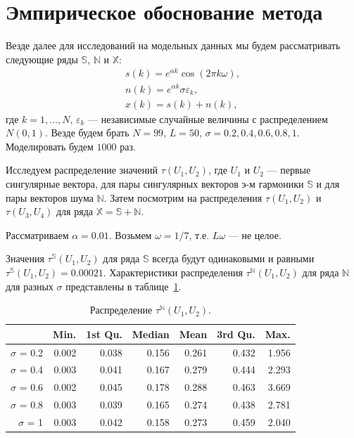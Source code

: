 \documentclass[specialist,
               substylefile = spbu.rtx,
               subf,href,colorlinks=true, 12pt]{disser}
\begin{document}
\section{Эмпирическое обоснование метода}
\label{sec:tau_study}
Везде далее для исследований на модельных данных мы будем рассматривать следующие ряды $\mathbb{S}$, $\mathbb{N}$ и $\mathbb{X}$:
\begin{gather} \label{eq:series_S_N}
s(k) =  e^{\alpha k} \cos(2\pi k \omega), \\  \label{eq:series_N_N}
n(k) =  e^{\alpha k} \sigma \varepsilon_k, \\ \label{eq:series_X_N}
x(k) = s(k) + n(k),
\end{gather}
где $k=1,\ldots,N$, $\varepsilon_k$ --- независимые случайные величины с распределением $N(0,1)$. Везде будем брать $N = 99$, $L = 50$, $\sigma = 0.2, 0.4, 0.6, 0.8, 1$. Моделировать будем $1000$ раз.

Исследуем распределение
 значений $\tau(U_1, U_2)$, где $U_1$ и $U_2$ --- первые сингулярные вектора, для пары сингулярных векторов э-м гармоники $\mathbb{S}$ и для пары векторов шума $\mathbb{N}$. Затем посмотрим на распределения  $\tau(U_1, U_2)$ и  $\tau(U_3, U_4)$ для ряда $\mathbb{X} = \mathbb{S} + \mathbb{N}$.

Рассматриваем $\alpha = 0.01$. Возьмем $\omega = 1/7$, т.е. $L\omega$ --- не целое.

Значения $\tau^{\mathbb{S}}(U_1, U_2)$  для ряда $\mathbb{S}$ всегда будут одинаковыми и равными  $\tau^{\mathbb{S}}(U_1, U_2) = 0.00021$. Характеристики распределения $\tau^{\mathbb{N}}(U_1, U_2)$ для ряда $\mathbb{N}$ для разных $\sigma$ представлены в таблице~\ref{tab:model_dist_tau1_sig_notint}.

\begin{table}[hhh!]
\caption{Распределение $\tau^{\mathbb{N}}(U_1, U_2)$.}
\centering
\begin{tabular}{rrrrrrr}
  \hline
 & Min. & 1st Qu. & Median & Mean & 3rd Qu. & Max. \\
  \hline
$\sigma$ = 0.2 & 0.002 & 0.038 & 0.156 & 0.261 & 0.432 & 1.956 \\ 
  $\sigma$ = 0.4 & 0.003 & 0.041 & 0.167 & 0.279 & 0.444 & 2.293 \\ 
  $\sigma$ = 0.6 & 0.002 & 0.045 & 0.178 & 0.288 & 0.463 & 3.669 \\ 
  $\sigma$ = 0.8 & 0.003 & 0.039 & 0.165 & 0.274 & 0.438 & 2.781 \\ 
  $\sigma$ = 1 & 0.003 & 0.042 & 0.158 & 0.273 & 0.459 & 2.040 \\ 
   \hline
\end{tabular}
\label{tab:model_dist_tau1_sig_notint}
\end{table}
\end{document}
